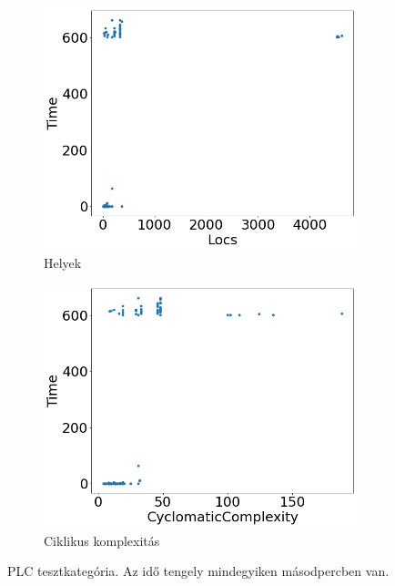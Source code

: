 \begin{figure}[ht]
\begin{subfigure}[b]{0.5\linewidth}
		\includegraphics[width=0.95\linewidth]{figures/plc/locs.png} 
		\caption{Helyek} 
		\label{fig7:c} 
	\end{subfigure}%
	\begin{subfigure}[b]{0.5\linewidth}
		\centering
		\includegraphics[width=0.95\linewidth]{figures/plc/cc.png} 
		\caption{Ciklikus komplexitás} 
		\label{fig7:d} 
	\end{subfigure} 
	\caption{PLC tesztkategória. Az idő tengely mindegyiken másodpercben van.}
	\label{fig_plc} 
\end{figure}

